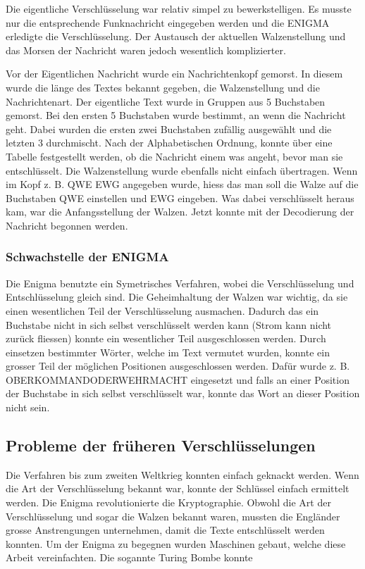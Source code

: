 Die eigentliche Verschlüsselung war relativ simpel zu bewerkstelligen. Es musste nur die entsprechende Funknachricht eingegeben werden und die ENIGMA erledigte die Verschlüsselung. Der Austausch der aktuellen Walzenstellung und das Morsen der Nachricht waren jedoch wesentlich komplizierter.

Vor der Eigentlichen Nachricht wurde ein Nachrichtenkopf gemorst. In diesem wurde die länge des Textes bekannt gegeben, die Walzenstellung und die Nachrichtenart. 
Der eigentliche Text wurde in Gruppen aus 5 Buchstaben gemorst. Bei den ersten 5 Buchstaben wurde bestimmt, an wenn die Nachricht geht. Dabei wurden die ersten zwei Buchstaben zufällig ausgewählt und die letzten 3 durchmischt. Nach der Alphabetischen Ordnung, konnte über eine Tabelle festgestellt werden, ob die Nachricht einem was angeht, bevor man sie entschlüsselt.
Die Walzenstellung wurde ebenfalls nicht einfach übertragen. Wenn im Kopf z. B. QWE EWG angegeben wurde, hiess das man soll die Walze auf die Buchstaben QWE einstellen und EWG eingeben. Was dabei verschlüsselt heraus kam, war die Anfangsstellung der Walzen. Jetzt konnte mit der Decodierung der Nachricht begonnen werden.

\subsubsection{Schwachstelle der ENIGMA}
Die Enigma benutzte ein Symetrisches Verfahren, wobei die Verschlüsselung und Entschlüsselung gleich sind. %
Die Geheimhaltung der Walzen war wichtig, da sie einen wesentlichen Teil der Verschlüsselung ausmachen.
Dadurch das ein Buchstabe nicht in sich selbst verschlüsselt werden kann (Strom kann nicht zurück fliessen) konnte ein wesentlicher Teil ausgeschlossen werden.
Durch einsetzen bestimmter Wörter, welche im Text vermutet wurden, konnte ein grosser Teil der möglichen Positionen ausgeschlossen werden. Dafür wurde z. B. OBERKOMMANDODERWEHRMACHT eingesetzt und falls an einer Position der Buchstabe in sich selbst verschlüsselt war, konnte das Wort an dieser Position nicht sein.

\subsection{Probleme der früheren Verschlüsselungen}
Die Verfahren bis zum zweiten Weltkrieg konnten einfach geknackt werden. Wenn die Art der Verschlüsselung bekannt war, konnte der Schlüssel einfach ermittelt werden. 
Die Enigma revolutionierte die Kryptographie. Obwohl die Art der Verschlüsselung und sogar die Walzen bekannt waren, mussten die Engländer grosse Anstrengungen unternehmen, damit die Texte entschlüsselt werden konnten. Um der Enigma zu begegnen wurden Maschinen gebaut, welche diese Arbeit vereinfachten. Die sogannte Turing Bombe konnte 


